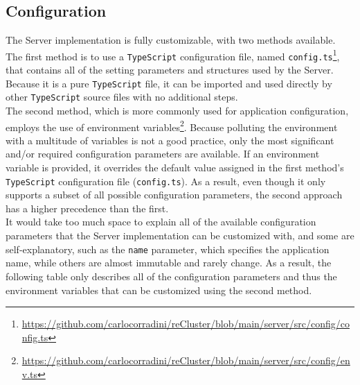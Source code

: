 \subsection{Configuration}
\label{subsec:implementation_server_configuration}

The Server implementation is fully customizable, with two methods available. \\ %
The first method is to use a \texttt{TypeScript} configuration file, named \texttt{config.ts}\footnote{\url{https://github.com/carlocorradini/reCluster/blob/main/server/src/config/config.ts}},
that contains all of the setting parameters and structures used by the Server.
Because it is a pure \texttt{TypeScript} file, it can be imported and used
directly by other \texttt{TypeScript} source files with no additional steps. \\ %
The second method, which is more commonly used for application configuration, employs
the use of environment variables\footnote{\url{https://github.com/carlocorradini/reCluster/blob/main/server/src/config/env.ts}}.
Because polluting the environment with a multitude of variables is not a good
practice, only the most significant and/or required configuration parameters are
available. If an environment variable is provided, it overrides the default value
assigned in the first method's \texttt{TypeScript} configuration file (\texttt{config.ts}).
As a result, even though it only supports a subset of all possible configuration
parameters, the second approach has a higher precedence than the first. \\ %
It would take too much space to explain all of the available configuration
parameters that the Server implementation can be customized with, and some are self-explanatory,
such as the \texttt{name} parameter, which specifies the application name, while
others are almost immutable and rarely change. As a result, the following table only
describes all of the configuration parameters and thus the environment variables
that can be customized using the second method.

